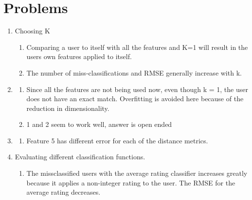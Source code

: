\documentclass{report}
\begin{document}
\section*{Problems}

\begin{enumerate}

\item Choosing K
  	
  	\begin{enumerate}
    
  	\item {
  	Comparing a user to itself with all the features and K=1 will result in the users own features applied to itself.
  	}
  	
    \item {
   	The number of miss-classifications and RMSE generally increase with k.
    }
    
	\end{enumerate}
	
\item

	\begin{enumerate}
	
	\item {	
	Since all the features are not being used now, even though k = 1, the user does not have an exact match.
	Overfitting is avoided here because of the reduction in dimensionality.
	}
	
	\item { 1 and 2 seem to work well, answer is open ended}
	
	\end{enumerate}
	
\item 

	\begin{enumerate}
	
	\item {
	Feature 5 has different error for each of the distance metrics.
	}
	
	\end{enumerate}


\item {
Evaluating different classification functions.
}
    \begin{enumerate}
	
	\item {
	The missclassified users with the average rating classifier increases greatly because it applies a non-integer rating to the user.
	The RMSE for the average rating decreases.
	}    
    \end{enumerate}
  
\end{enumerate}
\end{document}
